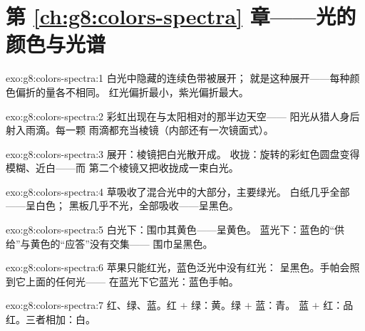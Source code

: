 \section*{第 \ref{ch:g8:colors-spectra} 章——光的颜色与光谱}

\begin{solution}{exo:g8:colors-spectra:1}
白光中隐藏的连续色带被展开；
就是这种展开——每种颜色偏折的量各不相同。
红光偏折最小，紫光偏折最大。
\end{solution}

\begin{solution}{exo:g8:colors-spectra:2}
彩虹出现在与太阳相对的那半边天空——
阳光从猎人身后射入雨滴。每一颗
雨滴都充当棱镜（内部还有一次镜面式）。
\end{solution}

\begin{solution}{exo:g8:colors-spectra:3}
展开：棱镜把白光散开成。
收拢：旋转的彩虹色圆盘变得模糊、近白——而
第二个棱镜又把收拢成一束白光。
\end{solution}

\begin{solution}{exo:g8:colors-spectra:4}
草吸收了混合光中的大部分，主要绿光。
白纸几乎全部——呈白色；
黑板几乎不光，全部吸收——呈黑色。
\end{solution}

\begin{solution}{exo:g8:colors-spectra:5}
白光下：围巾其黄色——呈黄色。
蓝光下：蓝色的“供给”与黄色的“应答”没有交集——
围巾呈黑色。
\end{solution}

\begin{solution}{exo:g8:colors-spectra:6}
苹果只能红光，蓝色泛光中没有红光：
呈黑色。手帕会照到它上面的任何光——
在蓝光下它蓝光：蓝色手帕。
\end{solution}

\begin{solution}{exo:g8:colors-spectra:7}
红、绿、蓝。红 $+$ 绿：黄。绿 $+$ 蓝：青。
蓝 $+$ 红：品红。三者相加：白。
\end{solution}

